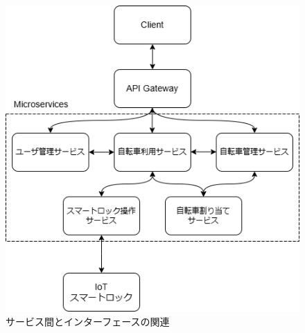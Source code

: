           \begin{figure}[b!]
            \centering
            \includegraphics[scale=0.49]
            {figures/microservice-architecture.png}
            \caption{サービス間とインターフェースの関連}
            \label{fig:サービス間とインターフェースの関連}
          \end{figure}

